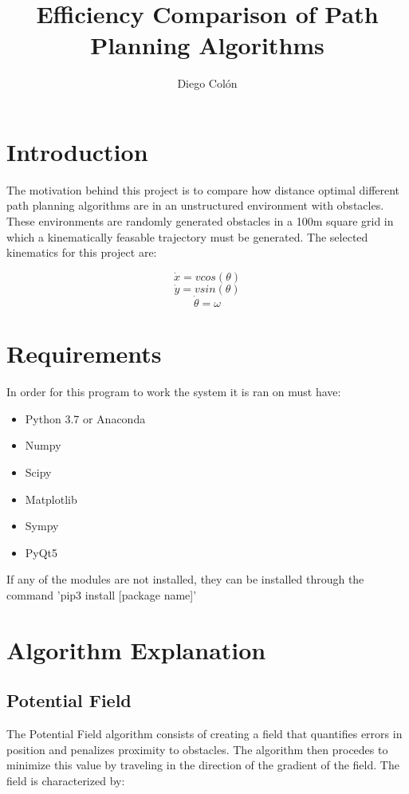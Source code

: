 \documentclass{article}
\title{Efficiency Comparison of Path Planning Algorithms}
\author{Diego Colón}
\begin{document}
\maketitle

\section{Introduction}

    The motivation behind this project is to compare how distance optimal different path planning algorithms are in an unstructured environment with obstacles. These environments are randomly generated obstacles in a 100m square grid in which a kinematically feasable trajectory must be generated. The selected kinematics for this project are:

    \begin{equation} \dot{x} = vcos(\theta) \end{equation}
    \begin{equation} \dot{y} = vsin(\theta) \end{equation}
    \begin{equation} \dot{\theta} = \omega \end{equation}    
    
\section{Requirements}
    In order for this program to work the system it is ran on must have:
    \begin{itemize}
        \item Python 3.7 or Anaconda
        \item Numpy
        \item Scipy
        \item Matplotlib
        \item Sympy
        \item PyQt5
    \end{itemize}

    If any of the modules are not installed, they can be installed through the command 'pip3 install [package name]'

\section{Algorithm Explanation}
    \subsection{Potential Field}
        The Potential Field algorithm consists of creating a field that quantifies errors in position and penalizes proximity to obstacles. The algorithm then procedes to minimize this value by traveling in the direction of the gradient of the field. The field is characterized by:
\end{document}
